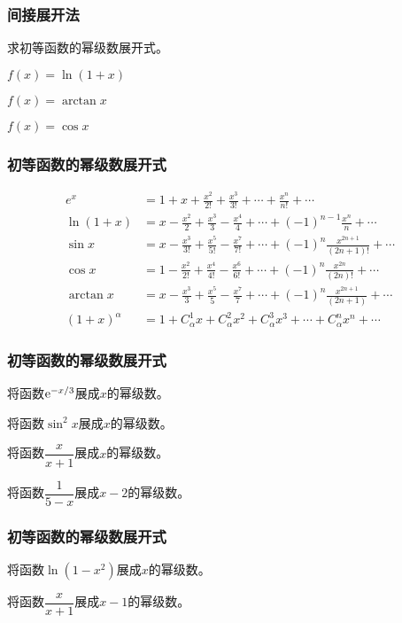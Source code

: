 \documentclass[14pt,notheorems,leqno,xcolor={rgb}]{beamer} %
\begin{document}
\begin{frame}
\frametitle{间接展开法}
\begin{example}
求初等函数的幂级数展开式。
\begin{enumlite}[<+->]
  \item $f(x)=\ln(1+x)$
  \item $f(x)=\arctan x$
  \item $f(x)=\cos x$
\end{enumlite}
\end{example}
\end{frame}

\begin{frame}[shrink=10]
\frametitle{初等函数的幂级数展开式}
\noindent\begin{align*}
e^x &= 1 + x + \frac{x^2}{2!} + \frac{x^3}{3!} + \cdots + \frac{x^n}{n!} + \cdots \\
\ln(1+x) &= x - \frac{x^2}2 + \frac{x^3}{3} - \frac{x^4}{4} + \cdots + (-1)^{n-1}\frac{x^n}{n} + \cdots \\
\sin x &= x-\frac{x^3}{3!}+\frac{x^5}{5!}-\frac{x^7}{7!}+\cdots + (-1)^n\frac{x^{2n+1}}{(2n+1)!} + \cdots \\
\cos x &= 1-\frac{x^2}{2!}+\frac{x^4}{4!}-\frac{x^6}{6!}+\cdots+(-1)^n\frac{x^{2n}}{(2n)!} + \cdots \\
\arctan x  &=x-\frac{x^3}{3}+\frac{x^5}{5}-\frac{x^7}{7}+\cdots + (-1)^n\frac{x^{2n+1}}{(2n+1)} + \cdots \\
(1+x)^{\alpha} &= 1 + C_\alpha^1x + C_\alpha^2x^2 + C_\alpha^3x^3 + \cdots + C_\alpha^n{x^n} + \cdots
\end{align*}
\end{frame}

\begin{frame}
\frametitle{初等函数的幂级数展开式}
\begin{example}
将函数$\mathrm{e}^{-x/3}$展成$x$的幂级数。
\end{example}
\vpause
\begin{example}
将函数$\sin^2x$展成$x$的幂级数。
\end{example}
\vpause
\begin{example}
将函数$\dfrac{x}{x+1}$展成$x$的幂级数。
\end{example}
\vpause
\begin{example}
将函数$\dfrac1{5-x}$展成$x-2$的幂级数。
\end{example}
\end{frame}

\begin{frame}
\frametitle{初等函数的幂级数展开式}
\begin{exercise}
将函数$\ln(1-x^2)$展成$x$的幂级数。
\end{exercise}
\pause
\begin{exercise}
将函数$\dfrac{x}{x+1}$展成$x-1$的幂级数。
\end{exercise}
\end{frame}
\end{document}
